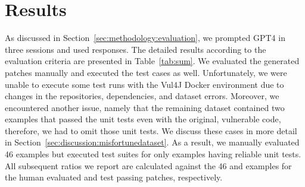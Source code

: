 \section{Results}
\label{sec:results}

As discussed in Section~\ref{sec:methodology:evaluation}, we prompted GPT4 in three sessions and used \topone responses.
The detailed results according to the evaluation criteria are presented in Table~\ref{tab:sum}.
We evaluated the generated patches manually and executed the test cases as well.
Unfortunately, we were unable to execute some test runs with the Vul4J Docker environment due to changes in the repositories, dependencies, and dataset errors.
Moreover, we encountered another issue, namely that the remaining dataset contained two examples that passed the unit tests even with the original, vulnerable code, therefore, we had to omit those unit tests.
We discuss these cases in more detail in Section~\ref{sec:discussion:misfortunedataset}.
As a result, we manually evaluated 46 examples but executed test suites for only \alltestcount{} examples having reliable unit tests.
All subsequent ratios we report are calculated against the 46 and \alltestcount{} examples for the human evaluated and test passing patches, respectively. 


